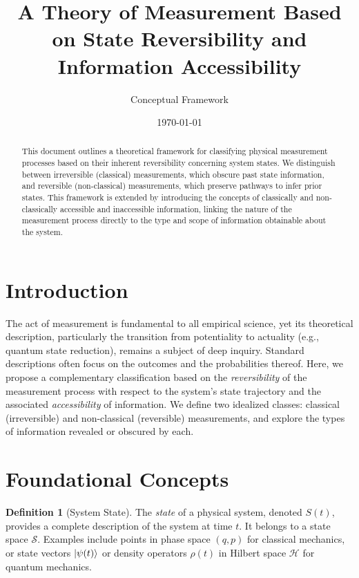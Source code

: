 \documentclass[11pt, a4paper]{article}
\theoremstyle{plain} %
\theoremstyle{definition} %
\newtheorem{definition}[theorem]{Definition}
\theoremstyle{remark} %
\newcommand{\SystemState}{\mathcal{S}} %
\begin{document}
	
	\title{A Theory of Measurement Based on State Reversibility and Information Accessibility}
	\author{Conceptual Framework}
	\date{\today} %
	
	\maketitle
	
	\begin{abstract}
		This document outlines a theoretical framework for classifying physical measurement processes based on their inherent reversibility concerning system states. We distinguish between irreversible (classical) measurements, which obscure past state information, and reversible (non-classical) measurements, which preserve pathways to infer prior states. This framework is extended by introducing the concepts of classically and non-classically accessible and inaccessible information, linking the nature of the measurement process directly to the type and scope of information obtainable about the system.
	\end{abstract}
	
	
	\section{Introduction}
	The act of measurement is fundamental to all empirical science, yet its theoretical description, particularly the transition from potentiality to actuality (e.g., quantum state reduction), remains a subject of deep inquiry. Standard descriptions often focus on the outcomes and the probabilities thereof. Here, we propose a complementary classification based on the \emph{reversibility} of the measurement process with respect to the system's state trajectory and the associated \emph{accessibility} of information. We define two idealized classes: classical (irreversible) and non-classical (reversible) measurements, and explore the types of information revealed or obscured by each.
	
	\section{Foundational Concepts}
	
	\begin{definition}[System State]
		The \emph{state} of a physical system, denoted $S(t)$, provides a complete description of the system at time $t$. It belongs to a state space $\SystemState$. Examples include points in phase space $(q,p)$ for classical mechanics, or state vectors $\ket{\psi(t)}$ or density operators $\rho(t)$ in Hilbert space $\mathcal{H}$ for quantum mechanics.
	\end{definition}
	
\end{document}
